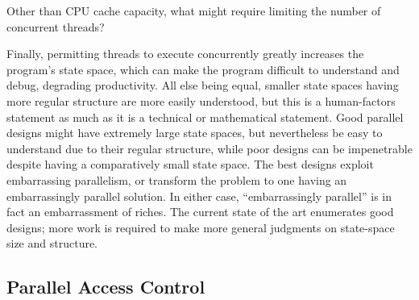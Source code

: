 \QuickQuiz{}
	Other than CPU cache capacity, what might require limiting the
	number of concurrent threads?
 \QuickQuizEnd

Finally, permitting threads to execute concurrently greatly increases
the program's state space, which can make the program difficult to
understand and debug, degrading productivity.
All else being equal, smaller state spaces having more regular structure
are more easily understood, but this is a human-factors statement as much
as it is a technical or mathematical statement.
Good parallel designs might have extremely large state spaces, but
nevertheless be easy to understand due to their regular structure,
while poor designs can be impenetrable despite having a comparatively
small state space.
The best designs exploit embarrassing parallelism, or transform the
problem to one having an embarrassingly parallel solution.
In either case, ``embarrassingly parallel'' is in fact
an embarrassment of riches.
The current state of the art enumerates good designs; more work is
required to make more general judgments on
state-space size and structure.

\subsection{Parallel Access Control}
\label{sec:Parallel Access Control}

